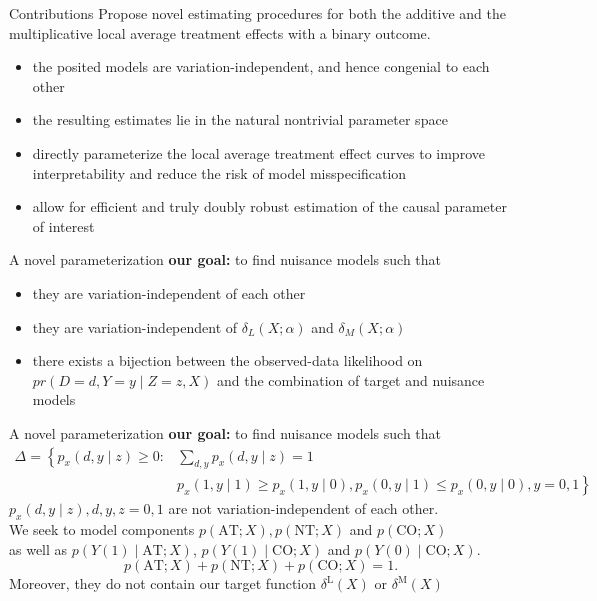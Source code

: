 \documentclass[aspectratio=169,xcolor=dvipsnames]{beamer}
\begin{document}
\begin{frame}{Contributions}
Propose novel estimating procedures for both the additive and the multiplicative
local average treatment effects with a binary outcome. \vspace{8pt}
\begin{itemize}
    \item the posited models are variation-independent, and hence congenial to each other
    \item the resulting estimates lie in the natural nontrivial parameter space
    \item directly parameterize the local average treatment effect curves to improve interpretability and reduce the risk of model misspecification
    \item allow for efficient and truly doubly robust estimation of the causal parameter of interest
\end{itemize}
\end{frame}

\begin{frame}{A novel parameterization}
\textbf{our goal: }to find nuisance models such that
\begin{itemize}
    \item they are variation-independent of each other
    \item they are variation-independent of $\delta_L(X;\alpha)$ and $\delta_M(X;\alpha)$
    \item there exists a bijection between the observed-data likelihood on $pr(D = d, Y = y \mid Z=
z, X )$ and the combination of target and nuisance models
\end{itemize}
\end{frame}

\begin{frame}{A novel parameterization}
\textbf{our goal: }to find nuisance models such that
$$
\begin{aligned}
\Delta=\left\{p_{x}(d, y \mid z) \geqslant 0:\right.& \sum_{d, y} p_{x}(d, y \mid z)=1 \\
&\left.p_{x}(1, y \mid 1) \geqslant p_{x}(1, y \mid 0), p_{x}(0, y \mid 1) \leqslant p_{x}(0, y \mid 0), y=0,1\right\}
\end{aligned}
$$
$p_{x}(d, y \mid z), d, y, z=0,1$ are not variation-independent of each other. \vspace{8pt}\\
We seek to model components  $p(\mathrm{AT} ; X), p(\mathrm{NT} ; X)$ and $p(\mathrm{CO} ; X)$ \vspace{8pt}\\
as well as $p(Y(1) \mid \mathrm{AT} ; X)$, $p(Y(1) \mid \mathrm{CO} ; X)$ and $p(Y(0) \mid \mathrm{CO} ; X)$. 
$$
p(\mathrm{AT} ; X)+p(\mathrm{NT} ; X)+p(\mathrm{CO} ; X)=1 .
$$
Moreover, they do not contain our target function $\delta^{\mathrm{L}}(X)$ or $\delta^{\mathrm{M}}(X)$%
\end{frame}
\end{document}
